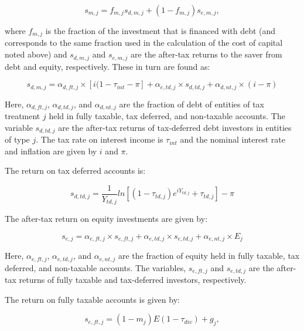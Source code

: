 \documentclass[article,11pt,letterpaper,fleqn]{article}
\theoremstyle{definition}
\numberwithin{equation}{section}
\begin{document}
\begin{equation}
s_{m,j} = f_{m,j}s_{d,m,j} + (1-f_{m,j})s_{e,m,j},
\end{equation}

\noindent\noindent where $f_{m,j}$ is the fraction of the investment that is financed with debt (and corresponds to the same fraction used in the calculation of the cost of capital noted above) and $s_{d,m,j}$ and $s_{e,m,j}$ are the after-tax returns to the saver from debt and equity, respectively.  These in turn are found as:

\begin{equation}
s_{d,m,j} = \alpha_{d,ft,j}\times \left[i(1-\tau_{int}-\pi\right] + \alpha_{e,td,j}\times s_{d,td,j} + \alpha_{d,nt,j}\times (i-\pi)
\end{equation}

Here, $\alpha_{d,ft,j}$, $\alpha_{d,td,j}$, and $\alpha_{d,nt,j}$ are the fraction of debt of entities of tax treatment $j$ held in fully taxable, tax deferred, and non-taxable accounts.  The variable $s_{d,td,j}$ are the after-tax returns of tax-deferred debt investors in entities of type $j$.  The tax rate on interest income is $\tau_{int}$ and the nominal interest rate and inflation are given by $i$ and $\pi$.


 The return on tax deferred accounts is:
 
 \begin{equation}
s_{d,td,j} = \frac{1}{Y_{td,j}}ln \left[(1-\tau_{td,j})e^{iY_{td,j}}+\tau_{td,j}\right]-\pi
\end{equation}


The after-tax return on equity investments are given by:

\begin{equation}
s_{e,j} = \alpha_{e,ft,j}\times s_{e,ft,j} + \alpha_{e,td,j}\times s_{e,td,j} + \alpha_{e,nt,j}\times E_{j}
\end{equation}

 

Here, $\alpha_{e,ft,j}$, $\alpha_{e,td,j}$, and $\alpha_{e,nt,j}$ are the fraction of equity held in fully taxable, tax deferred, and non-taxable accounts.  The variables, $s_{e,ft,j}$ and $s_{e,td,j}$ are the after-tax returns of fully taxable and tax-deferred investors, respectively.  

The return on fully taxable accounts is given by:

\begin{equation}
s_{e,ft,j} = (1-m_{j})E(1-\tau_{div}) + g_{j},
\end{equation}
\end{document}

